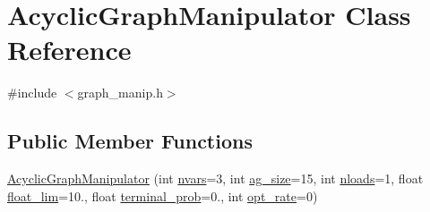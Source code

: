 \hypertarget{classAcyclicGraphManipulator}{}\section{Acyclic\+Graph\+Manipulator Class Reference}
\label{classAcyclicGraphManipulator}


{\ttfamily \#include $<$graph\+\_\+manip.\+h$>$}

\subsection*{Public Member Functions}
\begin{DoxyCompactItemize}
\item 
\hyperlink{classAcyclicGraphManipulator_ae822e96783de629b1278bdacc936e984}{Acyclic\+Graph\+Manipulator} (int \hyperlink{classAcyclicGraphManipulator_a1daae08faa803d96d51c71911a543bde}{nvars}=3, int \hyperlink{classAcyclicGraphManipulator_a1b0e2746882dd6cffae75018c831d99d}{ag\+\_\+size}=15, int \hyperlink{classAcyclicGraphManipulator_abaabd6c4fb4cee6b7adfc3fc146fb395}{nloads}=1, float \hyperlink{classAcyclicGraphManipulator_a6591f90b81ad497237fc80e923dae793}{float\+\_\+lim}=10., float \hyperlink{classAcyclicGraphManipulator_a0b11805aca890b75517094e6afd98875}{terminal\+\_\+prob}=0., int \hyperlink{classAcyclicGraphManipulator_ac6d1c55c9a9012663f66b3c027abef82}{opt\+\_\+rate}=0)\hypertarget{classAcyclicGraphManipulator_ae822e96783de629b1278bdacc936e984}{}\label{classAcyclicGraphManipulator_ae822e96783de629b1278bdacc936e984}


\end{DoxyCompactItemize}

